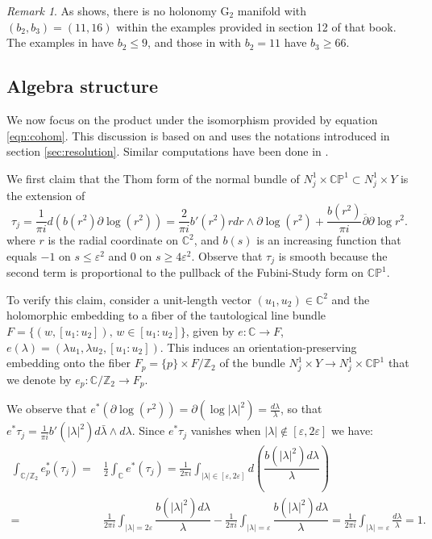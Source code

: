 \documentclass[10pt]{article}
\newcommand{\e}{\varepsilon}
\newcommand{\C}{\mathbb C}
\newcommand{\Z}{\mathbb Z}
\newcommand{\Gtwo}{\mathrm{G}_2}
\newcommand{\CP}{\mathbb{CP}}
\theoremstyle{plain}
\theoremstyle{definition}
\theoremstyle{remark}
\newtheorem{remark}{Remark}
\begin{document}
\begin{remark}
As \cite[Figure 12.3]{Joyce2} shows, there is no holonomy $\Gtwo$ manifold with $(b_2,b_3)=(11,16)$ within the examples provided in section 12 of that book. The examples in \cite[section 8]{Kovalev} have $b_2 \leq 9$, and those in \cite[section 6]{KL} with $b_2=11$ have $b_3\geq 66$. 
\end{remark}

\subsection{Algebra structure} \label{sec:prod}

We now focus on the product under the isomorphism provided by equation \eqref{eqn:cohom}. This discussion is based on \cite[Proposition 6.4]{LMM} and uses the notations introduced in section \ref{sec:resolution}. Similar computations have been done in \cites{FFKM,Taimanov}.

We first claim that the Thom form of the normal bundle of $N_j^1\times \CP^1 \subset N_j^1 \times Y$ is 
 the extension of
\begin{equation} \label{eqn:Thom}
\tau_j= \frac{1}{\pi i} d(b(r^2)\partial \log(r^2))=\frac{2}{\pi i}b'(r^2)rdr \wedge \partial \log(r^2)+ \frac{b(r^2)}{\pi i}\overline{\partial}{\partial}\log r^2 .
\end{equation}
where $r$ is the radial coordinate on $\C^2$, and $b(s)$ is an increasing function that equals $-1$ on $s\leq \e^2$ and $0$ on $s\geq 4\e^2$. Observe that $\tau_j$ is smooth because the second term is proportional to the pullback of the Fubini-Study form on $\CP^1$.

 To verify this claim, consider a unit-length vector $(u_1,u_2) \in \C^2$ and the holomorphic embedding to a fiber of the tautological line bundle $F=\{ (w,[u_1:u_2]), \, w\in [u_1:u_2] \}$, given by $e \colon \C \to F$, $e(\lambda)=(\lambda u_1, \lambda u_2, [u_1:u_2])$. This induces an orientation-preserving embedding onto the fiber $F_p=\{p\}\times F/\Z_2$ of the bundle $N_j^1 \times Y \to N_j^1 \times \CP^1$ that we denote by $e_p \colon \C/\Z_2 \to F_p$.

We observe that 
$
e^*(\partial \log (r^2))= \partial(\log |\lambda|^2)
= \frac{d\lambda}{\lambda}
$, so that
$
e^*\tau_j= \frac{1}{\pi i} b'(|\lambda|^2) d\bar{\lambda}\wedge d \lambda
$. Since $e^*\tau_j$ vanishes when $|\lambda| \notin [\e,2\e]$ we have:
\begin{align*}
\int_{\C/\Z_2}{e_p^*(\tau_j)}=&
\frac{1}{2}\int_{\C}{e^*(\tau_j)}= 
\frac{1}{2\pi i}\int_{|\lambda| \in [\e,2\e]}{d\left( \dfrac{b(|\lambda|^2)d\lambda}{\lambda} \right)} \\
=& \frac{1}{2\pi i} \int_{|\lambda|=2\e}{\dfrac{b(|\lambda|^2)d\lambda}{\lambda} } - \frac{1}{2\pi i} \int_{|\lambda|=\e}{\dfrac{b(|\lambda|^2)d\lambda}{\lambda} } = \frac{1}{2\pi i} \int_{|\lambda|=\e}{ \frac{d\lambda}{\lambda}}= 1.
\end{align*}
\end{document}
